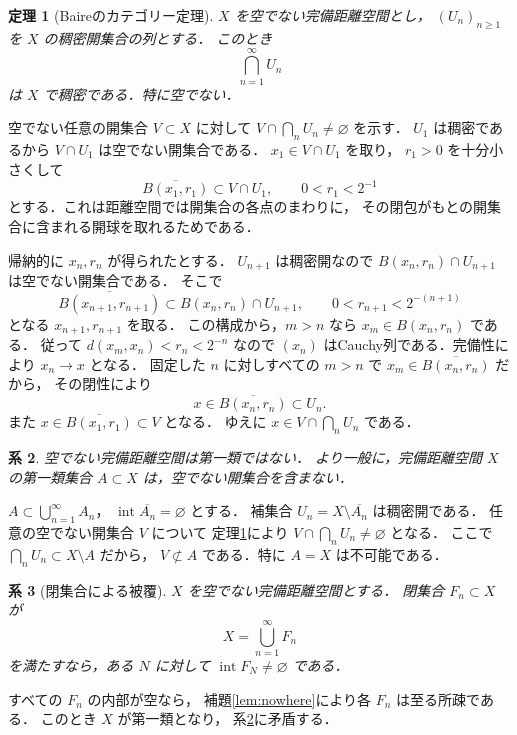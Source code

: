 \documentclass[a5paper,10pt,onecolumn]{jsarticle}
\makeatletter
\theoremstyle{mathnotetheorem}
\newtheorem{theorem}{定理}[section]
\newtheorem{corollary}[theorem]{系}
\renewcommand{\proofname}{証明}
\renewenvironment{proof}[1][\proofname]{%
  \par\pushQED{\qed}\normalfont\topsep4\p@\@plus2\p@\relax
  \trivlist\item[\hskip\labelsep\bfseries #1]\ignorespaces
}{\popQED\endtrivlist\@endpefalse}
\makeatother
\begin{document}
\begin{theorem}[Baireのカテゴリー定理]\label{thm:baire}
$X$ を空でない完備距離空間とし，
$(U_n)_{n\ge1}$ を $X$ の稠密開集合の列とする．
このとき
\[
 \bigcap_{n=1}^\infty U_n
\]
は $X$ で稠密である．特に空でない．
\end{theorem}
\begin{proof}
空でない任意の開集合 $V\subset X$ に対して
$V\cap\bigcap_nU_n\ne\varnothing$ を示す．
$U_1$ は稠密であるから $V\cap U_1$ は空でない開集合である．
$x_1\in V\cap U_1$ を取り，
$r_1>0$ を十分小さくして
\[
 \overline{B(x_1,r_1)}\subset V\cap U_1,
 \qquad 0<r_1<2^{-1}
\]
とする．これは距離空間では開集合の各点のまわりに，
その閉包がもとの開集合に含まれる開球を取れるためである．

帰納的に $x_n,r_n$ が得られたとする．
$U_{n+1}$ は稠密開なので
$B(x_n,r_n)\cap U_{n+1}$ は空でない開集合である．
そこで
\[
 \overline{B(x_{n+1},r_{n+1})}
 \subset B(x_n,r_n)\cap U_{n+1},
 \qquad 0<r_{n+1}<2^{-(n+1)}
\]
となる $x_{n+1},r_{n+1}$ を取る．
この構成から，$m>n$ なら $x_m\in B(x_n,r_n)$ である．
従って $d(x_m,x_n)<r_n<2^{-n}$ なので
$(x_n)$ はCauchy列である．完備性により $x_n\to x$ となる．
固定した $n$ に対しすべての $m>n$ で
$x_m\in\overline{B(x_n,r_n)}$ だから，
その閉性により
\[
 x\in\overline{B(x_n,r_n)}\subset U_n.
\]
また $x\in\overline{B(x_1,r_1)}\subset V$ となる．
ゆえに $x\in V\cap\bigcap_nU_n$ である．
\end{proof}

\begin{corollary}\label{cor:baire-category}
空でない完備距離空間は第一類ではない．
より一般に，完備距離空間 $X$ の第一類集合
$A\subset X$ は，空でない開集合を含まない．
\end{corollary}
\begin{proof}
$A\subset\bigcup_{n=1}^\infty A_n$，
$\operatorname{int}\overline{A_n}=\varnothing$ とする．
補集合 $U_n=X\setminus\overline{A_n}$ は稠密開である．
任意の空でない開集合 $V$ について
定理\ref{thm:baire}により
$V\cap\bigcap_nU_n\ne\varnothing$ となる．
ここで $\bigcap_nU_n\subset X\setminus A$ だから，
$V\not\subset A$ である．特に $A=X$ は不可能である．
\end{proof}

\begin{corollary}[閉集合による被覆]\label{cor:closedcover}
$X$ を空でない完備距離空間とする．
閉集合 $F_n\subset X$ が
\[
 X=\bigcup_{n=1}^\infty F_n
\]
を満たすなら，ある $N$ に対して
$\operatorname{int}F_N\ne\varnothing$ である．
\end{corollary}
\begin{proof}
すべての $F_n$ の内部が空なら，
補題\ref{lem:nowhere}により各 $F_n$ は至る所疎である．
このとき $X$ が第一類となり，
系\ref{cor:baire-category}に矛盾する．
\end{proof}
\end{document}
